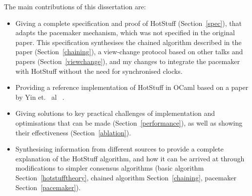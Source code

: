 The main contributions of this dissertation are:
\begin{itemize}
	\item Giving a complete specification and proof of HotStuff (Section~\ref{spec}), that adapts the pacemaker mechanism, which was not specified in the original paper. This specification synthesises the chained algorithm described in the paper (Section~\ref{chaining}), a view-change protocol based on other talks and papers (Section~\ref{viewchange}), and my changes to integrate the pacemaker with HotStuff without the need for synchronised clocks.
	\item Providing a reference implementation of HotStuff in OCaml based on a paper by Yin et. ~al~ \cite{yinHotStuffBFTConsensus2019}.
	\item Giving solutions to key practical challenges of implementation and optimisations that can be made (Section~\ref{performance}), as well as showing their effectiveness (Section~\ref{ablation}).
	\item Synthesising information from different sources to provide a complete explanation of the HotStuff algorithm, and how it can be arrived at through modifications to simpler consensus algorithms (basic algorithm Section~\ref{hotstufftheory}, chained algorithm Section~\ref{chaining}, pacemaker Section~\ref{pacemaker}).
\end{itemize}